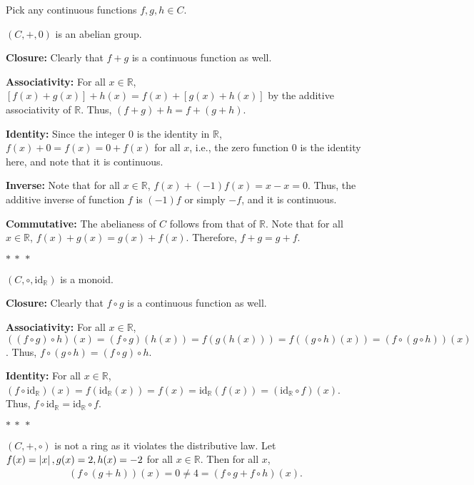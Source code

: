 \documentclass[12pt]{article}
\begin{document}
\begin{fproof}[Jacobson 2.1.1]
  Pick any continuous functions \(f,g,h \in C\).

  \((C, +, 0)\) is an abelian group. 

  \textbf{Closure:}
  Clearly that \(f+g\) is a continuous function as well.

  \textbf{Associativity:}
  For all \(x \in \mathbb{R}\),
  \([f(x) + g(x)] + h(x) = f(x) + [g(x) + h(x)]\) by the additive associativity of \(\mathbb{R}\). Thus, \((f + g) + h = f + (g + h)\).

  \textbf{Identity:}
  Since the integer 0 is the identity in \(\mathbb{R}\), \(f(x) + 0 = f(x) = 0 + f(x)\) for all \(x\), i.e., the zero function 0 is the identity here, and note that it is continuous.

  \textbf{Inverse:}
  Note that for all \(x \in \mathbb{R}\), \(f(x) + (-1)f(x) = x - x = 0\). Thus, the additive inverse of function \(f\) is \((-1)f\) or simply \(-f\), and it is continuous.

  \textbf{Commutative:}
  The abelianess of \(C\) follows from that of \(\mathbb{R}\). Note that for all \(x \in \mathbb{R}\), \(f(x) + g(x) = g(x) + f(x)\). Therefore, \(f + g = g + f\).

  \begin{center}
    \(\ast~\ast~\ast\)
  \end{center}

  \((C, \circ, \text{id}_{\mathbb{R}})\) is a monoid.

  \textbf{Closure:}
  Clearly that \(f \circ g\) is a continuous function as well.

  \textbf{Associativity:}
  For all \(x \in \mathbb{R}\),
  \(((f \circ g) \circ h) (x)= (f \circ g)(h(x)) = f(g(h(x))) = f((g \circ h) (x)) = (f \circ (g \circ h)) (x)\).
  Thus, \(f \circ (g \circ h) = (f \circ g) \circ h\).

  \textbf{Identity:}
  For all \(x \in \mathbb{R}\), \((f \circ \text{id}_{\mathbb{R}}) (x) = f(\text{id}_{\mathbb{R}}(x)) = f(x) = \text{id}_{\mathbb{R}}(f(x)) = (\text{id}_{\mathbb{R}} \circ f)(x)\). Thus, \(f \circ \text{id}_{\mathbb{R}} = \text{id}_{\mathbb{R}} \circ f\).

  \begin{center}
    \(\ast~\ast~\ast\)
  \end{center}

  \((C, +, \circ)\) is not a ring as it violates the distributive law.
  Let \(f(x) = \left\lvert x \right\rvert, g(x) = 2, h(x) = -2\) for all \(x \in \mathbb{R}\).
  Then for all \(x\),
  \begin{align*}
    (f \circ (g + h))(x) = 0 \neq 4 = (f \circ g + f \circ h)(x).
  \end{align*}
\end{fproof}
\newpage
\end{document}
